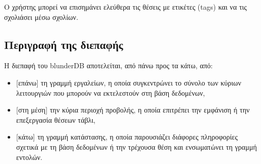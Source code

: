 \documentclass[letterpaper,10pt,greek]{sphinxmanual}
\begin{document}
\sphinxAtStartPar
Ο χρήστης μπορεί να επισημάνει ελεύθερα τις θέσεις με ετικέτες (tags) και να τις σχολιάσει μέσω σχολίων.


\subsection{Περιγραφή της διεπαφής}
\label{\detokenize{manuel:description-de-l-interface}}
\sphinxAtStartPar
Η διεπαφή του blunderDB αποτελείται, από πάνω προς τα κάτω, από:
\begin{itemize}
\item {} 
\sphinxAtStartPar
{[}επάνω{]} τη γραμμή εργαλείων, η οποία συγκεντρώνει το σύνολο των κύριων λειτουργιών που μπορούν να εκτελεστούν στη βάση δεδομένων,

\item {} 
\sphinxAtStartPar
{[}στη μέση{]} την κύρια περιοχή προβολής, η οποία επιτρέπει την εμφάνιση ή την επεξεργασία θέσεων τάβλι,

\item {} 
\sphinxAtStartPar
{[}κάτω{]} τη γραμμή κατάστασης, η οποία παρουσιάζει διάφορες πληροφορίες σχετικά με τη βάση δεδομένων ή την τρέχουσα θέση και ενσωματώνει τη γραμμή εντολών.

\end{itemize}
\end{document}
